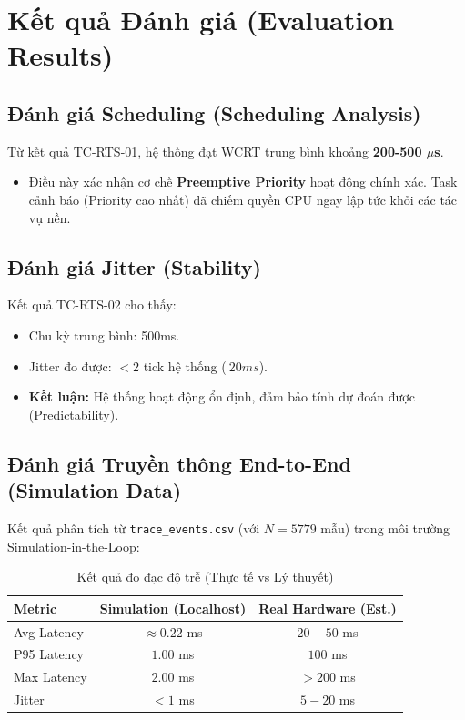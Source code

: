 \documentclass[12pt,a4paper]{report}
\begin{document}
\section{Kết quả Đánh giá (Evaluation Results)}

\subsection{Đánh giá Scheduling (Scheduling Analysis)}
Từ kết quả TC-RTS-01, hệ thống đạt WCRT trung bình khoảng \textbf{200-500 $\mu$s}.
\begin{itemize}
    \item Điều này xác nhận cơ chế \textbf{Preemptive Priority} hoạt động chính xác. Task cảnh báo (Priority cao nhất) đã chiếm quyền CPU ngay lập tức khỏi các tác vụ nền.
\end{itemize}

\subsection{Đánh giá Jitter (Stability)}
Kết quả TC-RTS-02 cho thấy:
\begin{itemize}
    \item Chu kỳ trung bình: 500ms.
    \item Jitter đo được: $< 2$ tick hệ thống ($~20ms$).
    \item \textbf{Kết luận:} Hệ thống hoạt động ổn định, đảm bảo tính dự đoán được (Predictability).
\end{itemize}

\subsection{Đánh giá Truyền thông End-to-End (Simulation Data)}
Kết quả phân tích từ \texttt{trace\_events.csv} (với $N=5779$ mẫu) trong môi trường Simulation-in-the-Loop:

\begin{table}[H]
\centering
\begin{tabular}{|l|c|c|}
\hline
\textbf{Metric} & \textbf{Simulation (Localhost)} & \textbf{Real Hardware (Est.)} \\ \hline
Avg Latency & $\approx 0.22$ ms & $20 - 50$ ms \\ \hline
P95 Latency & $1.00$ ms & $100$ ms \\ \hline
Max Latency & $2.00$ ms & $> 200$ ms \\ \hline
Jitter & $< 1$ ms & $5 - 20$ ms \\ \hline
\end{tabular}
\caption{Kết quả đo đạc độ trễ (Thực tế vs Lý thuyết)}
\end{table}
\end{document}

